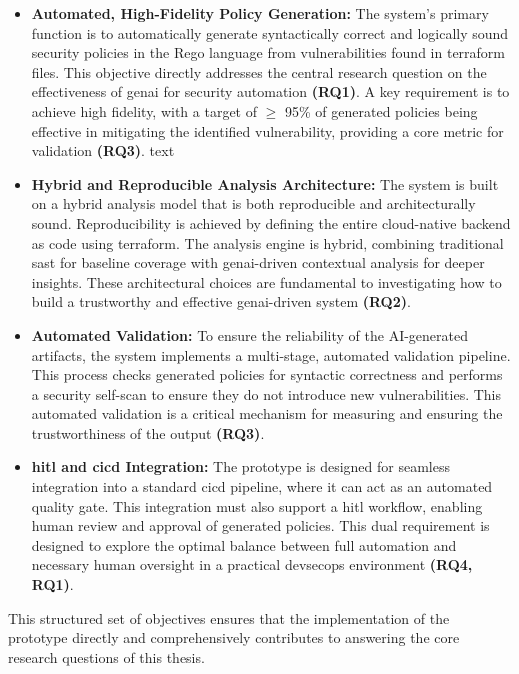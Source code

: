 \begin{itemize}
\item \textbf{Automated, High-Fidelity Policy Generation:} The system's primary function is to automatically generate syntactically correct and logically sound security policies in the Rego language from vulnerabilities found in \gls{terraform} files. This objective directly addresses the central research question on the effectiveness of \gls{genai} for security automation \textbf{(RQ1)}. A key requirement is to achieve high fidelity, with a target of $\geq$ 95\% of generated policies being effective in mitigating the identified vulnerability, providing a core metric for validation \textbf{(RQ3)}.
text
\item \textbf{Hybrid and Reproducible Analysis Architecture:} The system is built on a hybrid analysis model that is both reproducible and architecturally sound. Reproducibility is achieved by defining the entire \gls{cloud-native} backend as code using \gls{terraform}. The analysis engine is hybrid, combining traditional \gls{sast} for baseline coverage with \gls{genai}-driven contextual analysis for deeper insights. These architectural choices are fundamental to investigating how to build a trustworthy and effective \gls{genai}-driven system \textbf{(RQ2)}.

\item \textbf{Automated Validation:} To ensure the reliability of the AI-generated artifacts, the system implements a multi-stage, automated validation pipeline. This process checks generated policies for syntactic correctness and performs a security self-scan to ensure they do not introduce new vulnerabilities. This automated validation is a critical mechanism for measuring and ensuring the trustworthiness of the output \textbf{(RQ3)}.

\item \textbf{\gls{hitl} and \gls{cicd} Integration:} The prototype is designed for seamless integration into a standard \gls{cicd} pipeline, where it can act as an automated quality gate. This integration must also support a \gls{hitl} workflow, enabling human review and approval of generated policies. This dual requirement is designed to explore the optimal balance between full automation and necessary human oversight in a practical \gls{devsecops} environment \textbf{(RQ4, RQ1)}.
\end{itemize}

This structured set of objectives ensures that the implementation of the prototype directly and comprehensively contributes to answering the core research questions of this thesis.

